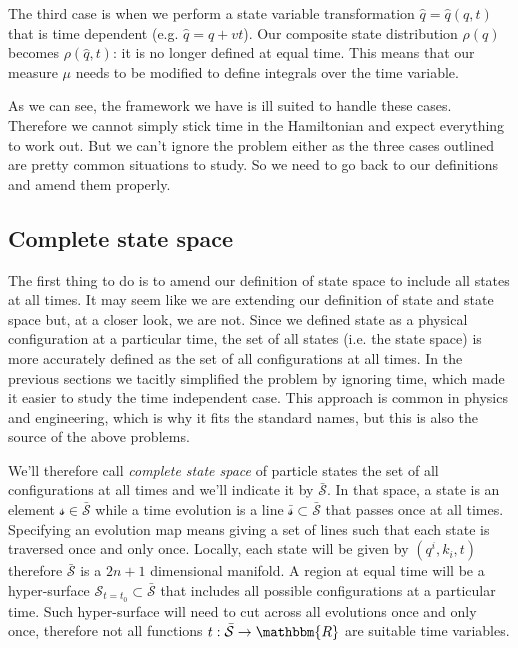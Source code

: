 \documentclass[aps,pra,10pt,twocolumn,floatfix,nofootinbib]{revtex4-1}
\numberwithin{equation}{section}
\theoremstyle{definition}
\begin{document}
The third case is when we perform a state variable transformation $\hat{q}=\hat{q}(q,t)$ that is time dependent (e.g. $\hat{q}=q+vt$). Our composite state distribution $\rho(q)$ becomes $\rho(\hat{q},t)$: it is no longer defined at equal time. This means that our measure $\mu$ needs to be modified to define integrals over the time variable.

As we can see, the framework we have is ill suited to handle these cases. Therefore we cannot simply stick time in the Hamiltonian and expect everything to work out. But we can't ignore the problem either as the three cases outlined are pretty common situations to study. So we need to go back to our definitions and amend them properly.

\subsection{Complete state space}

The first thing to do is to amend our definition of state space to include all states at all times. It may seem like we are extending our definition of state and state space but, at a closer look, we are not. Since we defined state as a physical configuration at a particular time, the set of all states (i.e. the state space) is more accurately defined as the set of all configurations at all times. In the previous sections we tacitly simplified the problem by ignoring time, which made it easier to study the time independent case. This approach is common in physics and engineering, which is why it fits the standard names, but this is also the source of the above problems.

We'll therefore call \emph{complete state space} of particle states the set of all configurations at all times and we'll indicate it by $\bar{\mathcal{S}}$. In that space, a state is an element $\mathcal{s} \in \bar{\mathcal{S}}$ while a time evolution is a line $\bar{\mathcal{s}} \subset \bar{\mathcal{S}}$ that passes once at all times. Specifying an evolution map means giving a set of lines such that each state is traversed once and only once. Locally, each state will be given by $(q^i, k_i, t)$ therefore $\bar{\mathcal{S}}$ is a $2n+1$ dimensional manifold. A region at equal time will be a hyper-surface $\mathcal{S}_{t=t_0} \subset \bar{\mathcal{S}}$ that includes all possible configurations at a particular time. Such hyper-surface will need to cut across all evolutions once and only once, therefore not all functions $t : \bar{\mathcal{S}} \rightarrow \mathbbm{R}$ are suitable time variables.
\end{document}
